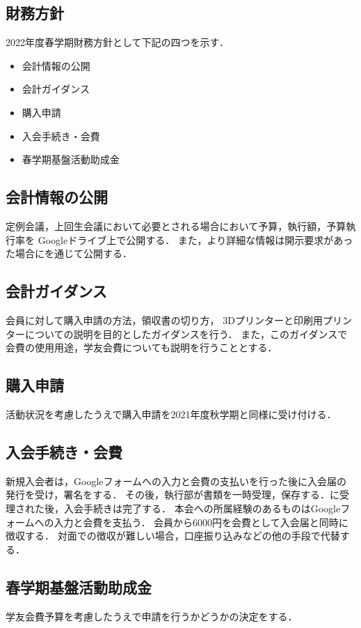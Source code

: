 \subsection*{財務方針}


2022年度春学期財務方針として下記の四つを示す．
\begin{itemize}
    \item 会計情報の公開
    \item 会計ガイダンス
    \item 購入申請
    \item 入会手続き・会費
    \item 春学期基盤活動助成金
\end{itemize}

\subsection*{会計情報の公開}
定例会議，上回生会議において必要とされる場合において予算，執行額，予算執行率を Googleドライブ上で公開する．
また，より詳細な情報は開示要求があった場合に\kaikeiStaff{}を通じて公開する．

\subsection*{会計ガイダンス}
会員に対して購入申請の方法，領収書の切り方， 3Dプリンターと印刷用プリンターについての説明を目的としたガイダンスを行う．
また，このガイダンスで会費の使用用途，学友会費についても説明を行うこととする．

\subsection*{購入申請}
活動状況を考慮したうえで購入申請を2021年度秋学期と同様に受け付ける．

\subsection*{入会手続き・会費}
新規入会者は，Googleフォームへの入力と会費の支払いを行った後に入会届の発行を受け，署名をする．
その後，執行部が書類を一時受理，保存する．\president{}に受理された後，入会手続きは完了する．
本会への所属経験のあるものはGoogleフォームへの入力と会費を支払う．
会員から6000円を会費として入会届と同時に徴収する．
対面での徴収が難しい場合，口座振り込みなどの他の手段で代替する．

\subsection*{春学期基盤活動助成金}
学友会費予算を考慮したうえで申請を行うかどうかの決定をする．
